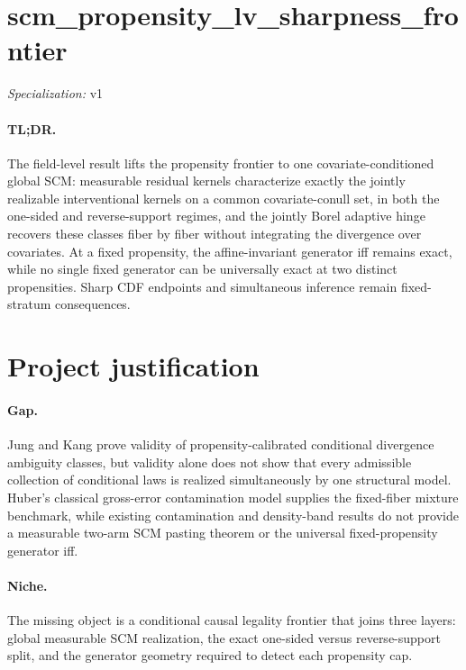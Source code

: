 \documentclass{article}
\begin{document}
\sloppy

\section*{scm\_\allowbreak{}propensity\_\allowbreak{}lv\_\allowbreak{}sharpness\_\allowbreak{}frontier}

\noindent\textit{Specialization:} v1\par

\paragraph{TL;DR.} The field-level result lifts the propensity frontier to one covariate-conditioned global SCM: measurable residual kernels characterize exactly the jointly realizable interventional kernels on a common covariate-conull set, in both the one-sided and reverse-support regimes, and the jointly Borel adaptive hinge recovers these classes fiber by fiber without integrating the divergence over covariates. At a fixed propensity, the affine-invariant generator iff remains exact, while no single fixed generator can be universally exact at two distinct propensities. Sharp CDF endpoints and simultaneous inference remain fixed-stratum consequences.

\section{Project justification}

\paragraph{Gap.} Jung and Kang prove validity of propensity-calibrated conditional divergence ambiguity classes, but validity alone does not show that every admissible collection of conditional laws is realized simultaneously by one structural model. Huber's classical gross-error contamination model supplies the fixed-fiber mixture benchmark, while existing contamination and density-band results do not provide a measurable two-arm SCM pasting theorem or the universal fixed-propensity generator iff.

\paragraph{Niche.} The missing object is a conditional causal legality frontier that joins three layers: global measurable SCM realization, the exact one-sided versus reverse-support split, and the generator geometry required to detect each propensity cap.
\end{document}
